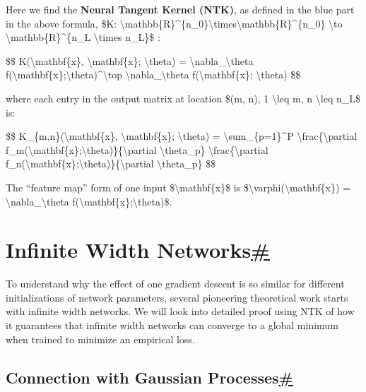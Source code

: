 Here we find the \textbf{Neural Tangent Kernel (NTK)}, as defined in the blue part in the above formula, \$K: \textbackslash mathbb\{R\}\^{}\{n\_0\}\textbackslash times\textbackslash mathbb\{R\}\^{}\{n\_0\} \textbackslash to \textbackslash mathbb\{R\}\^{}\{n\_L \textbackslash times n\_L\}\$ :

\$\$ K(\textbackslash mathbf\{x\}, \textbackslash mathbf\{x\}\textquotesingle; \textbackslash theta) = \textbackslash nabla\_\textbackslash theta f(\textbackslash mathbf\{x\};\textbackslash theta)\^{}\textbackslash top \textbackslash nabla\_\textbackslash theta f(\textbackslash mathbf\{x\}\textquotesingle; \textbackslash theta) \$\$

where each entry in the output matrix at location \$(m, n), 1 \textbackslash leq m, n \textbackslash leq n\_L\$ is:

\$\$ K\_\{m,n\}(\textbackslash mathbf\{x\}, \textbackslash mathbf\{x\}\textquotesingle; \textbackslash theta) = \textbackslash sum\_\{p=1\}\^{}P \textbackslash frac\{\textbackslash partial f\_m(\textbackslash mathbf\{x\};\textbackslash theta)\}\{\textbackslash partial \textbackslash theta\_p\} \textbackslash frac\{\textbackslash partial f\_n(\textbackslash mathbf\{x\}\textquotesingle;\textbackslash theta)\}\{\textbackslash partial \textbackslash theta\_p\} \$\$

The ``feature map'' form of one input \$\textbackslash mathbf\{x\}\$ is \$\textbackslash varphi(\textbackslash mathbf\{x\}) = \textbackslash nabla\_\textbackslash theta f(\textbackslash mathbf\{x\};\textbackslash theta)\$.

\section{\texorpdfstring{Infinite Width Networks\hyperref[infinite-width-networks]{\#}}{Infinite Width Networks\#}}\label{infinite-width-networks}

To understand why the effect of one gradient descent is so similar for different initializations of network parameters, several pioneering theoretical work starts with infinite width networks. We will look into detailed proof using NTK of how it guarantees that infinite width networks can converge to a global minimum when trained to minimize an empirical loss.

\subsection{\texorpdfstring{Connection with Gaussian Processes\hyperref[connection-with-gaussian-processes]{\#}}{Connection with Gaussian Processes\#}}\label{connection-with-gaussian-processes}

